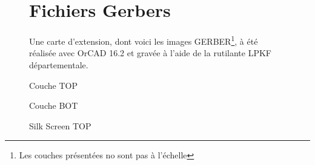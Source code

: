 \documentclass[10pt,a4paper,final]{article}
\begin{document}
\begin{spacing}{1.5}
\begin{figure}[hbtp]
\section{Fichiers Gerbers}
Une carte d'extension, dont voici les images GERBER\footnote{Les couches présentées no sont pas à l'échelle}, à été réalisée avec OrCAD 16.2 et gravée à l'aide de la rutilante LPKF départementale.
\caption{Couche TOP}
\centering
{}

\bigskip
\bigskip
\bigskip
\bigskip
\bigskip

\caption{Couche BOT}
\end{figure}


\begin{figure}[hbtp]
\caption{Silk Screen TOP}
\centering
{}

\bigskip
\bigskip
\bigskip
\bigskip
\bigskip


\end{figure}
\end{spacing}
\end{document}

